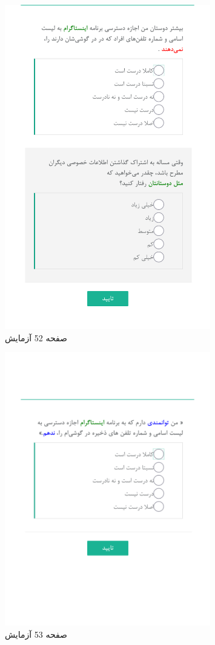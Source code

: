 { 
\begin{figure}[htpb]
\centering
\includegraphics[width=0.8\textwidth]{./img/Task52.png/}
\caption{ صفحه 52 آزمایش }
\label{fig:Task52}
\end{figure}
 
 
\begin{figure}[htpb]
\centering
\includegraphics[width=0.8\textwidth]{./img/Task53.png/}
\caption{ صفحه 53 آزمایش }
\label{fig:Task53}
\end{figure}
 
}
